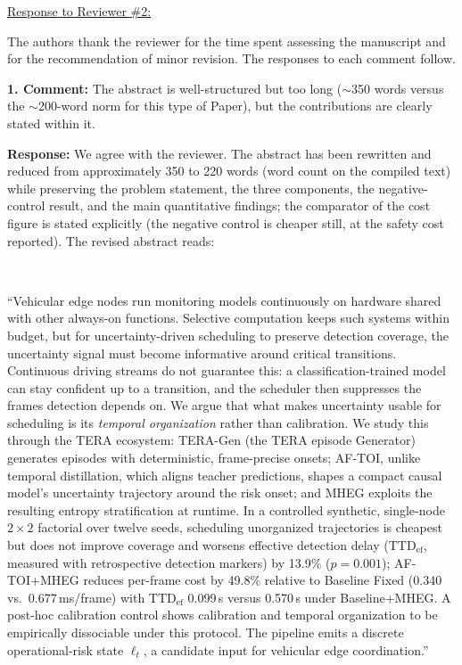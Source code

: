 \documentclass[1p,12pt,authoryear]{elsarticle}
\begin{document}
\newpage


\begin{large}
\noindent \underline{Response to Reviewer \#2:}
\end{large}

\vspace{10pt}

\noindent The authors thank the reviewer for the time spent assessing the manuscript and for the recommendation of minor revision. The responses to each comment follow.

\vspace{0.5cm}
\noindent \textbf{1. Comment:} The abstract is well-structured but too long ($\sim$350 words versus the $\sim$200-word norm for this type of Paper), but the contributions are clearly stated within it.

\vspace{2mm}
\noindent \textbf{Response:} We agree with the reviewer. The abstract has been rewritten and reduced from approximately 350 to 220 words (word count on the compiled text) while preserving the problem statement, the three components, the negative-control result, and the main quantitative findings; the comparator of the cost figure is stated explicitly (the negative control is cheaper still, at the safety cost reported). The revised abstract reads:

~

``Vehicular edge nodes run monitoring models continuously on hardware shared with other always-on functions. Selective computation keeps such systems within budget, but for uncertainty-driven scheduling to preserve detection coverage, the uncertainty signal must become informative around critical transitions. Continuous driving streams do not guarantee this: a classification-trained model can stay confident up to a transition, and the scheduler then suppresses the frames detection depends on. We argue that what makes uncertainty usable for scheduling is its \emph{temporal organization} rather than calibration. We study this through the TERA ecosystem: TERA-Gen (the TERA episode Generator) generates episodes with deterministic, frame-precise onsets; AF-TOI, unlike temporal distillation, which aligns teacher predictions, shapes a compact causal model's uncertainty trajectory around the risk onset; and MHEG exploits the resulting entropy stratification at runtime. In a controlled synthetic, single-node $2\times2$ factorial over twelve seeds, scheduling unorganized trajectories is cheapest but does not improve coverage and worsens effective detection delay ($\mathrm{TTD}_{\mathrm{ef}}$, measured with retrospective detection markers) by 13.9\% ($p=0.001$); AF-TOI+MHEG reduces per-frame cost by 49.8\% relative to Baseline Fixed (0.340 vs.\ 0.677\,ms/frame) with $\mathrm{TTD}_{\mathrm{ef}}$ 0.099\,s versus 0.570\,s under Baseline+MHEG. A post-hoc calibration control shows calibration and temporal organization to be empirically dissociable under this protocol. The pipeline emits a discrete operational-risk state $\ell_t$, a candidate input for vehicular edge coordination.''
\end{document}
